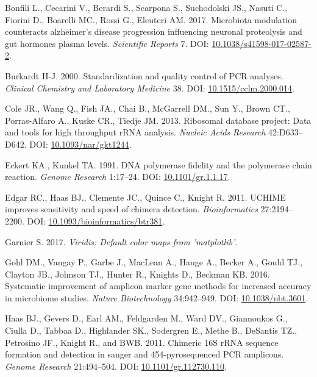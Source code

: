 \documentclass[11pt,]{article}
\begin{document}
\hypertarget{ref-Bonfili2017}{}
Bonfili L., Cecarini V., Berardi S., Scarpona S., Suchodolski JS.,
Nasuti C., Fiorini D., Boarelli MC., Rossi G., Eleuteri AM. 2017.
Microbiota modulation counteracts alzheimer's disease progression
influencing neuronal proteolysis and gut hormones plasma levels.
\emph{Scientific Reports} 7. DOI:
\href{https://doi.org/10.1038/s41598-017-02587-2}{10.1038/s41598-017-02587-2}.

\hypertarget{ref-Burkardt2000}{}
Burkardt H-J. 2000. Standardization and quality control of PCR analyses.
\emph{Clinical Chemistry and Laboratory Medicine} 38. DOI:
\href{https://doi.org/10.1515/cclm.2000.014}{10.1515/cclm.2000.014}.

\hypertarget{ref-rdp_Cole_2013}{}
Cole JR., Wang Q., Fish JA., Chai B., McGarrell DM., Sun Y., Brown CT.,
Porras-Alfaro A., Kuske CR., Tiedje JM. 2013. Ribosomal database
project: Data and tools for high throughput rRNA analysis. \emph{Nucleic
Acids Research} 42:D633--D642. DOI:
\href{https://doi.org/10.1093/nar/gkt1244}{10.1093/nar/gkt1244}.

\hypertarget{ref-Eckert1991}{}
Eckert KA., Kunkel TA. 1991. DNA polymerase fidelity and the polymerase
chain reaction. \emph{Genome Research} 1:17--24. DOI:
\href{https://doi.org/10.1101/gr.1.1.17}{10.1101/gr.1.1.17}.

\hypertarget{ref-uchime_Edgar_2011}{}
Edgar RC., Haas BJ., Clemente JC., Quince C., Knight R. 2011. UCHIME
improves sensitivity and speed of chimera detection.
\emph{Bioinformatics} 27:2194--2200. DOI:
\href{https://doi.org/10.1093/bioinformatics/btr381}{10.1093/bioinformatics/btr381}.

\hypertarget{ref-viridis_citation_2017}{}
Garnier S. 2017. \emph{Viridis: Default color maps from 'matplotlib'}.

\hypertarget{ref-taq_Gohl_2016}{}
Gohl DM., Vangay P., Garbe J., MacLean A., Hauge A., Becker A., Gould
TJ., Clayton JB., Johnson TJ., Hunter R., Knights D., Beckman KB. 2016.
Systematic improvement of amplicon marker gene methods for increased
accuracy in microbiome studies. \emph{Nature Biotechnology} 34:942--949.
DOI: \href{https://doi.org/10.1038/nbt.3601}{10.1038/nbt.3601}.

\hypertarget{ref-Haas2011}{}
Haas BJ., Gevers D., Earl AM., Feldgarden M., Ward DV., Giannoukos G.,
Ciulla D., Tabbaa D., Highlander SK., Sodergren E., Methe B., DeSantis
TZ., Petrosino JF., Knight R., and BWB. 2011. Chimeric 16S rRNA sequence
formation and detection in sanger and 454-pyrosequenced PCR amplicons.
\emph{Genome Research} 21:494--504. DOI:
\href{https://doi.org/10.1101/gr.112730.110}{10.1101/gr.112730.110}.
\end{document}
